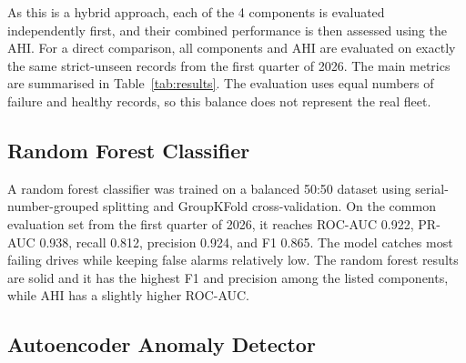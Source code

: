 \documentclass[sigconf,natbib=false]{acmart}
\begin{document}
As this is a hybrid approach, each of the 4 components is evaluated independently first, and their combined performance is then assessed using the AHI. For a direct comparison, all components and AHI are evaluated on exactly the same strict-unseen records from the first quarter of 2026. The main metrics are summarised in Table~\ref{tab:results}. The evaluation uses equal numbers of failure and healthy records, so this balance does not represent the real fleet.

\begin{table}[h]
\centering
\caption{All components and AHI evaluated on the same strict-unseen first quarter of 2026 records (1{,}018 failure and 1{,}018 healthy records).}
\label{tab:results}
\end{table}

\subsection{Random Forest Classifier}

A random forest classifier was trained on a balanced 50:50 dataset using serial-number-grouped splitting and GroupKFold cross-validation. On the common evaluation set from the first quarter of 2026, it reaches ROC-AUC 0.922, PR-AUC 0.938, recall 0.812, precision 0.924, and F1 0.865. The model catches most failing drives while keeping false alarms relatively low. The random forest results are solid and it has the highest F1 and precision among the listed components, while AHI has a slightly higher ROC-AUC.

\subsection{Autoencoder Anomaly Detector}
\end{document}
